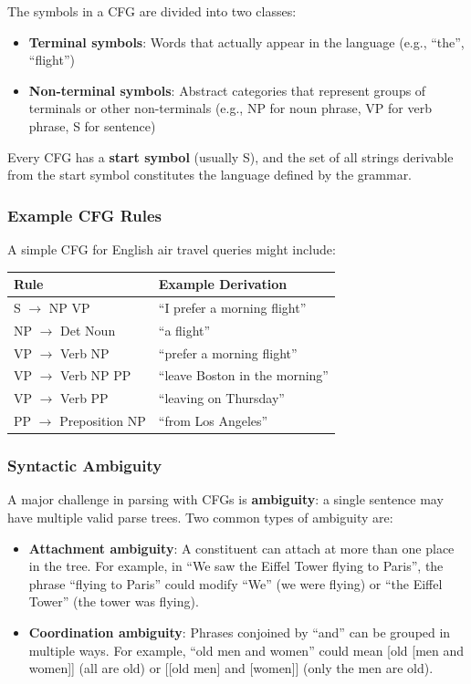\documentclass[11pt,a4paper]{article}
\begin{document}
The symbols in a CFG are divided into two classes:
\begin{itemize}
    \item \textbf{Terminal symbols}: Words that actually appear in the language (e.g., ``the'', ``flight'')
    \item \textbf{Non-terminal symbols}: Abstract categories that represent groups of terminals or other non-terminals (e.g., NP for noun phrase, VP for verb phrase, S for sentence)
\end{itemize}

Every CFG has a \textbf{start symbol} (usually S), and the set of all strings derivable from the start symbol constitutes the language defined by the grammar.

\subsubsection{Example CFG Rules}

A simple CFG for English air travel queries might include:
\begin{center}
\begin{tabular}{|l|l|}
\hline
\textbf{Rule} & \textbf{Example Derivation} \\ \hline
S $\to$ NP VP & ``I prefer a morning flight'' \\ \hline
NP $\to$ Det Noun & ``a flight'' \\ \hline
VP $\to$ Verb NP & ``prefer a morning flight'' \\ \hline
VP $\to$ Verb NP PP & ``leave Boston in the morning'' \\ \hline
VP $\to$ Verb PP & ``leaving on Thursday'' \\ \hline
PP $\to$ Preposition NP & ``from Los Angeles'' \\ \hline
\end{tabular}
\end{center}

\subsubsection{Syntactic Ambiguity}

A major challenge in parsing with CFGs is \textbf{ambiguity}: a single sentence may have multiple valid parse trees. Two common types of ambiguity are:
\begin{itemize}
    \item \textbf{Attachment ambiguity}: A constituent can attach at more than one place in the tree. For example, in ``We saw the Eiffel Tower flying to Paris'', the phrase ``flying to Paris'' could modify ``We'' (we were flying) or ``the Eiffel Tower'' (the tower was flying).
    \item \textbf{Coordination ambiguity}: Phrases conjoined by ``and'' can be grouped in multiple ways. For example, ``old men and women'' could mean [old [men and women]] (all are old) or [[old men] and [women]] (only the men are old).
\end{itemize}
\end{document}
